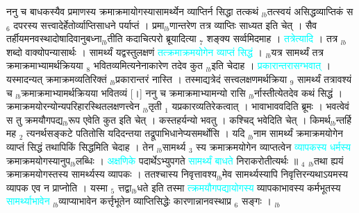 \documentclass[article,12pt,a4paper]{memoir}%
\newcommand{\quotelemma}[1]{\textcolor{cyan}{#1}}
\newcounter{parCount}
\begin{document}
	  
	  \pstart \leavevmode%
	ननु च बाधकस्यैव प्रमाणस्य क्रमाक्रमायोगस्यासामर्थ्येन व्याप्तिर्न सिद्धा तत्कथं {\tiny $_{lb}$}तत्स्वयं असिद्धव्याप्तिकं स {\tiny $_{6}$} दपरस्य सत्त्वादेर्हेतोर्व्याप्तिसाधने पर्याप्तं । प्रमा{\tiny $_{lb}$}णान्तरेण तत्र व्याप्तिः साध्यत इति चेत् । सैव तर्हीयमनवस्थादोषादिवानुबध्ना{\tiny $_{lb}$}तीति कदाचित्परो ब्रूयादित्या {\tiny $_{7}$} शङ्क्य सर्व्वमिदमाह । \quotelemma{तत्रेत्यादि} \cite[1b11]{vn-msN} । तत्र {\tiny $_{lb}$}शब्दो वाक्योपन्यासार्थः । सामर्थ्यं यद्वस्तुलक्षणं \quotelemma{तत्क्रमाक्रमयोगेन व्याप्तं सिद्धं} । {\tiny $_{lb}$}यत्र सामर्थ्यं तत्र क्रमाक्रमाभ्यामर्थक्रियया {\tiny $_{8}$} भवितव्यमित्यनेनाकारेण तदेव कुत {\tiny $_{lb}$}इति चेदाह । \quotelemma{प्रकारान्तरासग्भवात्} \cite[1b11]{vn-msN} । यस्मादन्यत् क्रमाक्रमव्यतिरिक्तं {\tiny $_{lb}$}प्रकारान्तरं नास्ति । तस्माद्यत्रेदं सत्त्वलक्षणमर्थक्रिया {\tiny $_{9}$} \leavevmode{} सामर्थ्यं तत्रावश्यं च {\tiny $_{lb}$}क्रमाक्रमाभ्यामर्थक्रियया भवितव्यं [।] ननु च क्रमाक्रमाभ्यामन्यो रासि {\tiny $_{lb}$}\leavevmode{}र्नास्तीत्येतदेव कथं सिद्धं । क्रमाक्रमयोरन्योन्यपरिहारस्थितलक्षणत्त्वेन {\tiny $_{lb}$}तृती {\tiny $_{1}$} यप्रकारव्यतिरेकत्वात् । भावाभाववदिति ब्रूमः । भवत्वेवं स तु क्रमयौगपद्य{\tiny $_{lb}$}रूप एवेति कुत इति चेत् । कस्तहर्यन्यो भवतु । कश्चिद् भवेदिति चेत् । किमर्थ{\tiny $_{lb}$}न्तर्हि मह {\tiny $_{2}$} त्यनर्थसङ्कटे पतितोसि यदिदन्तया तद्रूपाभिधानेप्यसमर्थोसि । यदि {\tiny $_{lb}$}नाम सामर्थ्यं क्रमाक्रमयोगेन व्याप्तं सिद्धं तथापिकिं सिद्धमिति चेदाह । तेन {\tiny $_{lb}$}सामर्थ्य {\tiny $_{3}$} स्य क्रमाक्रमयोगेन व्याप्तत्वेन \quotelemma{व्यापकस्य धर्मस्य} क्रमाक्रमयोगस्यानुप{\tiny $_{lb}$}लब्धिः \cite[2a1]{vn-msN} । \quotelemma{अक्षणिके} पदार्थेऽभ्युपगते \quotelemma{सामर्थ्यं बाधते} निराकरोतीत्यर्थः ॥ {\tiny $_{4}$} {\tiny $_{lb}$}तथा ह्ययं क्रमाक्रमयोगस्तस्य सामर्थ्यस्य व्यापकः । ततश्चास्य निवृत्तावश्य{\tiny $_{lb}$}मेव सामर्थ्यस्यापि निवृत्तिरन्यथाऽयमस्य व्यापक एव न प्राप्नोति । यस्मा {\tiny $_{5}$} त्तद्वा{\tiny $_{lb}$}धते इति तस्मा \quotelemma{त्क्रमयौगपद्यायोगस्य} व्यापकाभावस्य कर्मभूतस्य \quotelemma{सामर्थ्याभावेन} {\tiny $_{lb}$}व्याप्याभावेन कर्त्तृभूतेन व्याप्तिसिद्धेः कारणान्नानवस्थाप्र {\tiny $_{6}$} सङ्गः ।
	{}
	\pend%
      {\tiny $_{lb}$}
\end{document}

